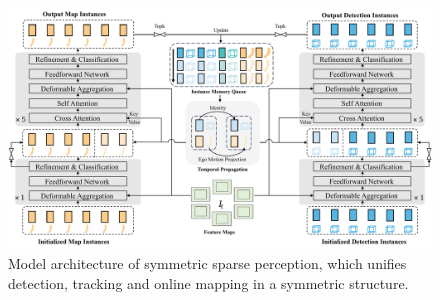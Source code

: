 \begin{figure}[htbp]
  \centering
  \includegraphics[width=0.85\linewidth]{Figures/sparse_perception_.pdf}
  \caption{Model architecture of symmetric sparse perception, which unifies detection, tracking and online mapping in a symmetric structure.}
  \label{fig:sparse_perception}
\end{figure}